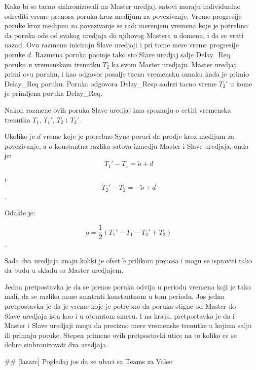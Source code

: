 \documentclass[a4paper,12pt, master]{etf}
\begin{document}
	Kako bi se tacno sinhronizovali na Master uredjaj, satovi moraju individualno odrediti vreme
	prenosa poruka kroz medijum za povezivanje. Vreme progresije poruke kroz medijum za povezivanje
	se radi merenjem vremena koje je potrebno da poruka ode od svakog uredjaja do njihovog Mastera
	u domenu, i da se vrati nazad. Ovu razmenu iniciraju Slave uredjaji i pri tome mere vreme
	progresije poruke $d$. Razmena poruka pocinje tako sto Slave uredjaj salje Delay\_Req poruku u
	vremenskom trenutku $T_2$ ka svom Master uredjaju. Master uredjaj primi ovu poruku, i kao
	odgovor posalje tacnu vremensku oznaku kada je primio Delay\_Req poruku. Poruka odgovora
	Delay\_Resp sadrzi tacno vreme $T_2'$ u kome je primljena poruka Delay\_Req.

	Nakon razmene ovih poruka Slave uredjaj ima spoznaju o cetiri vremenska trenutka $T_1$, $T_1'$,
	$T_2$ i $T_2'$.

	Ukoliko je $d$ vreme koje je potrebno Sync poruci da prodje kroz medijum za povezivanje, a $\tilde{o}$
	konstantna razlika satova izmedju Master i Slave uredjaja, onda je:
	\begin{equation}
		T_1' - T_1 = \tilde{o} + d
	\end{equation}

	i
	\begin{equation}
			T_2' - T_2 = -\tilde{o} + d
	\end{equation}.

	Odakle je:

	\begin{equation}
		\tilde{o}=\frac{1}{2}(T_1' - T_1 - T_2' + T_2)
	\end{equation}.

	Sada dva uredjaja znaju koliki je ofset $\tilde{o}$ prilikom prenosa i mogu se ispraviti tako da budu
	u skladu sa Master uredjajem.

	Jedna pretpostavka je da se prenos poruka odvija u periodu vremena koji je tako mali, da se
	razlika moze smatrati konstantnom u tom periodu. Jos jedna pretpostavka je da je vreme koje je
	potrebno da poruka stigne od Master do Slave uredjaja ista kao i u obrnutom smeru. I na kraju,
	pretpostavka je da i Master i Slave uredjaji mogu da precizno mere vremenske trenutke u kojima
	salju ili primaju poruke. Stepen primene ovih pretpostavki utice na to koliko ce se dobro
	sinhronizovati dva uredjaja.

	\#\# [lazarc] Pogledaj jos da se ubaci sa Teams za Valeo

	\newpage
\end{document}
